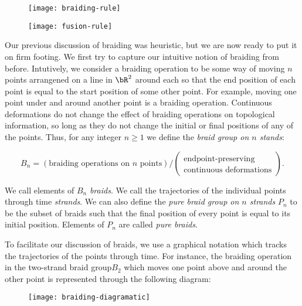 \begin{figure}
\begin{center}
\texttt{[image: braiding-rule]}
\label{braiding-rule}
\end{center}
\end{figure}

\begin{figure}
\begin{center}
\texttt{[image: fusion-rule]}
\label{fusion-rule}
\end{center}
\end{figure}

Our previous discussion of braiding was heuristic, but we are now ready to put it on firm footing. We first try to capture our intuitive notion of braiding from before. Intutively, we consider a braiding operation to be some way of moving $n$ points arrangened on a line in $\bR^2$ around each so that the end position of each point is equal to the start position of some other point. For example, moving one point under and around another point is a braiding operation. Continuous deformations do not change the effect of braiding operations on topological information, so long as they do not change the initial or final positions of any of the points. Thus, for any integer $n\geq 1$ we define the \textit{braid group on $n$ stands}:

$$B_n=(\text{braiding operations on $n$ points})/(\substack{\text{endpoint-preserving} \\ \text{continuous deformations}}).$$

We call elements of $B_n$ {\em braids}. We call the trajectories of the individual points through time \textit{strands}. We can also define the {\em pure braid group on $n$ strands} $P_n$ to be the subset of braids such that the final position of every point is equal to its initial position. Elements of $P_n$ are called {\em pure braids}.

To facilitate our discussion of braids, we use a graphical notation which tracks the trajectories of the points through time. For instance, the braiding operation in the two-strand braid group$B_2$ which moves one point above and around the other point is represented through the following diagram:

\begin{figure}[h]
\begin{center}
\texttt{[image: braiding-diagramatic]}
\label{braiding-diagramatic}
\end{center}
\end{figure}

